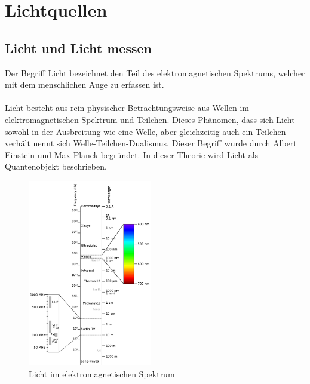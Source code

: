\documentclass[11pt]{scrartcl}
\begin{document}
\section{Lichtquellen}
\subsection{Licht und Licht messen} \label{light and measurement}
Der Begriff Licht bezeichnet den Teil des elektromagnetischen Spektrums, welcher mit dem menschlichen Auge zu erfassen ist.\\
\\
Licht besteht aus rein physischer Betrachtungsweise aus Wellen im elektromagnetischen Spektrum und Teilchen. Dieses Phänomen, dass sich
Licht sowohl in der Ausbreitung wie eine Welle, aber gleichzeitig auch ein Teilchen verhält nennt sich Welle-Teilchen-Dualismus.
Dieser Begriff wurde durch Albert Einstein und Max Planck begründet. In dieser Theorie wird Licht als Quantenobjekt
beschrieben. \cite{wikiLicht}\\
\begin{figure}
    \vspace{-25pt}
    \begin{center}
        \includegraphics[width=0.48\textwidth]{images/Elektromagnetisches-Spektrum.png}
    \end{center}
    \vspace{-20pt}
    \caption{Licht im elektromagnetischen Spektrum \cite{spectrumLight}}
    \vspace{-15pt}
\end{figure}
\end{document}
